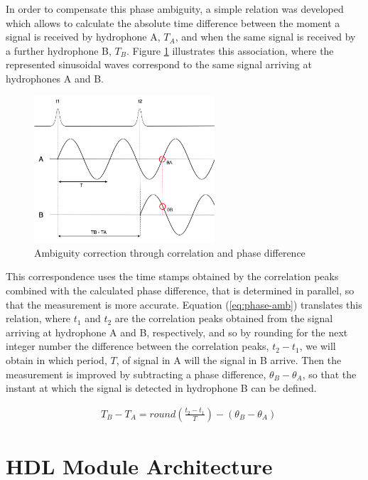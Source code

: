 In order to compensate this phase ambiguity, a simple relation was developed which allows to calculate the absolute time difference between the moment a signal is received by hydrophone A, $T_A$, and when the same signal is received by a further hydrophone B, $T_B$. Figure \ref{fig:ambiguity} illustrates this association, where the represented sinusoidal waves correspond to the same signal arriving at hydrophones A and B. 

\begin{figure}[!htbp]
	\centering
	\includegraphics[width=0.6\textwidth]{figures/ambiguity}
	\captionsetup{justification=centering,margin=2cm}
	\caption{Ambiguity correction through correlation and phase difference}
	\label{fig:ambiguity}
\end{figure}

This correspondence uses the time stamps obtained by the correlation peaks combined with the calculated phase difference, that is determined in parallel, so that the measurement is more accurate. Equation (\ref{eq:phase-amb}) translates this relation, where $t_1$ and $t_2$ are the correlation peaks obtained from the signal arriving at hydrophone A and B, respectively, and so by rounding for the next integer number the difference between the correlation peaks, $t_2 - t_1$, we will obtain in which period, $T$, of signal in A will the signal in B arrive. Then the measurement is improved by subtracting a phase difference, $\theta_B - \theta_A$, so that the instant at which the signal is detected in hydrophone B can be defined. 

\begin{eqnarray}
	& T_B - T_A = round(\frac{t_2-t_1}{T}) - (\theta_B - \theta_A)
	\label{eq:phase-amb}
\end{eqnarray}

\section{HDL Module Architecture} \label{subchap:HDL module}

